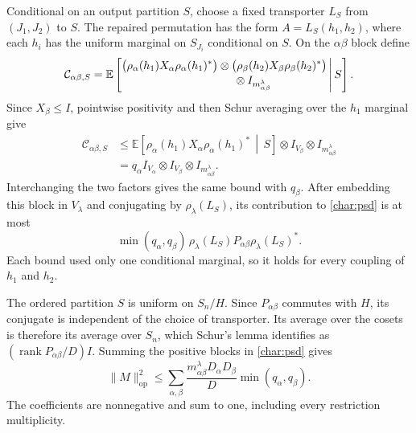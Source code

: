 Conditional on an output partition $S$, choose a fixed transporter
$L_S$ from $(J_1,J_2)$ to $S$. The repaired permutation has the form
$A=L_S(h_1,h_2)$, where each $h_i$ has the uniform marginal on
$S_{J_i}$ conditional on $S$. On the $\alpha\beta$ block define
\[
 \mathcal C_{\alpha\beta,S}
 =\mathbb E\left[
 \begin{aligned}
 &\bigl(\rho_\alpha(h_1)X_\alpha\rho_\alpha(h_1)^*\bigr)
 \otimes
 \bigl(\rho_\beta(h_2)X_\beta\rho_\beta(h_2)^*\bigr)\\[-2pt]
 &\hspace{35mm}\otimes I_{m_{\alpha\beta}^\lambda}
 \end{aligned}
 \,\middle|\,S\right].
\]
Since $X_\beta\le I$, pointwise positivity and then Schur averaging
over the $h_1$ marginal give
\[
 \begin{aligned}
 \mathcal C_{\alpha\beta,S}
 &\le
 \mathbb E\!\left[
   \rho_\alpha(h_1)X_\alpha\rho_\alpha(h_1)^*\,\middle|\,S
 \right]\otimes I_{V_\beta}\otimes I_{m_{\alpha\beta}^\lambda}\\
 &=q_\alpha I_{V_\alpha}\otimes I_{V_\beta}
       \otimes I_{m_{\alpha\beta}^\lambda}.
 \end{aligned}
\]
Interchanging the two factors gives the same bound with $q_\beta$.
After embedding this block in $V_\lambda$ and conjugating by
$\rho_\lambda(L_S)$, its contribution to \eqref{char:psd} is at most
\[
 \min(q_\alpha,q_\beta)\,
 \rho_\lambda(L_S)P_{\alpha\beta}\rho_\lambda(L_S)^*.
\]
Each bound used only one conditional marginal, so it holds for every
coupling of $h_1$ and $h_2$.

The ordered partition $S$ is uniform on $S_n/H$. Since
$P_{\alpha\beta}$ commutes with $H$, its conjugate is independent of
the choice of transporter. Its average over the cosets is therefore
its average over $S_n$, which Schur's lemma identifies as
$(\operatorname{rank}P_{\alpha\beta}/D)I$. Summing the positive blocks
in \eqref{char:psd} gives
\begin{equation}\label{char:minbound}
 \|M\|_{\mathrm{op}}^2
 \le\sum_{\alpha,\beta}
 \frac{m_{\alpha\beta}^\lambda D_\alpha D_\beta}{D}
 \min(q_\alpha,q_\beta).
\end{equation}
The coefficients are nonnegative and sum to one, including every
restriction multiplicity.

